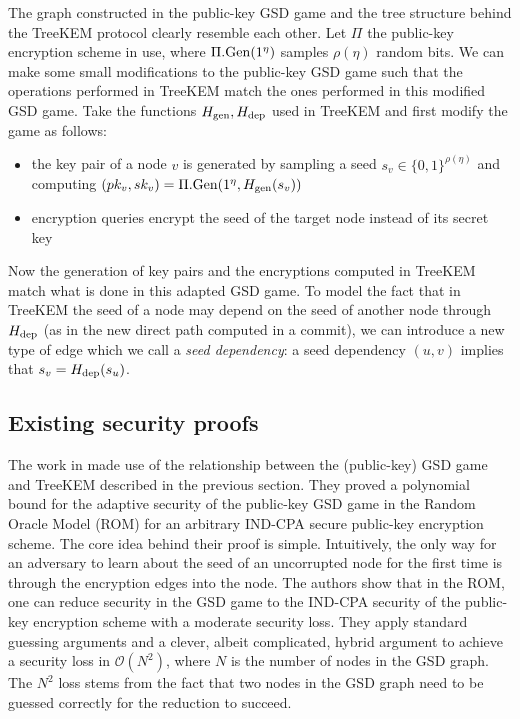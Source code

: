The graph constructed in the public-key GSD game and the tree structure behind the TreeKEM protocol clearly resemble each other. Let $\Pi$ the public-key encryption scheme in use, where $\Pi.\mathrm{Gen}(1^\eta)$ samples $\rho(\eta)$ random bits. We can make some small modifications to the public-key GSD game such that the operations performed in TreeKEM match the ones performed in this modified GSD game. Take the functions $H_\mathrm{gen}, H_\mathrm{dep}$ used in TreeKEM and first modify the game as follows:
\begin{itemize}
	\item the key pair of a node $v$ is generated by sampling a seed $s_v \in \{0, 1\}^{\rho(\eta)}$ and computing $(pk_v, sk_v) = \Pi.\mathrm{Gen}(1^\eta, H_\mathrm{gen}(s_v))$
	\item encryption queries encrypt the seed of the target node instead of its secret key
\end{itemize}
Now the generation of key pairs and the encryptions computed in TreeKEM match what is done in this adapted GSD game. To model the fact that in TreeKEM the seed of a node may depend on the seed of another node through $H_\mathrm{dep}$ (as in the new direct path computed in a commit), we can introduce a new type of edge which we call a \emph{seed dependency}: a seed dependency $(u, v)$ implies that $s_v = H_\mathrm{dep}(s_u)$.

\subsection{Existing security proofs}

The work in \cite{ttkem} made use of the relationship between the (public-key) GSD game and TreeKEM described in the previous section. They proved a polynomial bound for the adaptive security of the public-key GSD game in the Random Oracle Model (ROM) \cite{rom} for an arbitrary IND-CPA secure public-key encryption scheme. The core idea behind their proof is simple. Intuitively, the only way for an adversary to learn about the seed of an uncorrupted node for the first time is through the encryption edges into the node. The authors show that in the ROM, one can reduce security in the GSD game to the IND-CPA security of the public-key encryption scheme with a moderate security loss. They apply standard guessing arguments and a clever, albeit complicated, hybrid argument to achieve a security loss in $\mathcal{O}(N^2)$, where $N$ is the number of nodes in the GSD graph. The $N^2$ loss stems from the fact that two nodes in the GSD graph need to be guessed correctly for the reduction to succeed.

